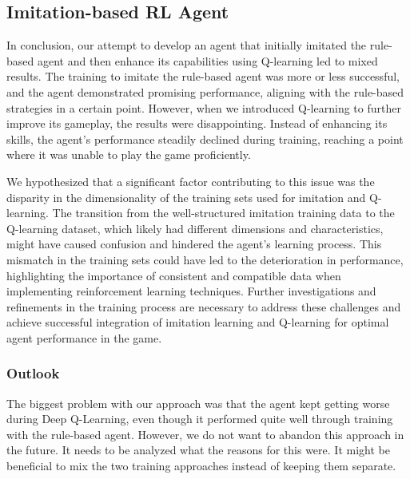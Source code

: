 \subsection{Imitation-based RL Agent}

In conclusion, our attempt to develop an agent that initially imitated the rule-based agent and then enhance its capabilities using Q-learning led 
to mixed results. The training to imitate the rule-based agent was more or less successful, and the agent demonstrated promising performance, aligning with the rule-based 
strategies in a certain point. However, when we introduced Q-learning to further improve its gameplay, the results were disappointing. Instead of enhancing its skills, 
the agent's performance steadily declined during training, reaching a point where it was unable to play the game proficiently.

We hypothesized that a significant factor contributing to this issue was the disparity in the dimensionality of the training sets 
used for imitation and Q-learning. The transition from the well-structured imitation training data to the Q-learning dataset, which likely 
had different dimensions and characteristics, might have caused confusion and hindered the agent's learning process. This mismatch in the training sets 
could have led to the deterioration in performance, highlighting the importance of consistent and compatible data when implementing reinforcement learning techniques. 
Further investigations and refinements in the training process are necessary to address these challenges and achieve successful integration of imitation learning and
Q-learning for optimal agent performance in the game.

\subsubsection{Outlook}

The biggest problem with our approach was that the agent kept getting worse during Deep Q-Learning, 
even though it performed quite well through training with the rule-based agent. However, we do not want 
to abandon this approach in the future. It needs to be analyzed what the reasons for this were.
It might be beneficial to mix the two training approaches instead of keeping them separate.